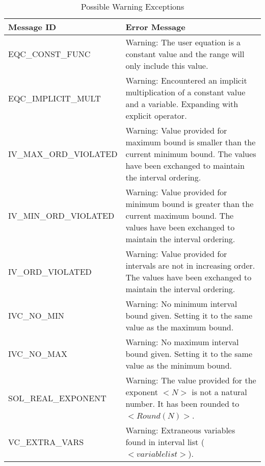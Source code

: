 \documentclass[12pt, titlepage]{article}
\begin{document}
\begin{longtable}{l p{9.5cm}}
	\caption{Possible Warning Exceptions} \\
	\toprule
	\textbf{Message ID} & \textbf{Error Message} \\
	\midrule
	EQC\_CONST\_FUNC & Warning: The user equation is a constant value and the 
	range will only include this value.\\
	EQC\_IMPLICIT\_MULT & Warning: Encountered an implicit multiplication of a 
	constant value and a variable. Expanding with explicit operator. \\
	IV\_MAX\_ORD\_VIOLATED & Warning: Value provided for maximum bound is 
	smaller than the current minimum bound. The values have been exchanged to 
	maintain the interval ordering. \\
	IV\_MIN\_ORD\_VIOLATED & Warning: Value provided for minimum bound is 
	greater than the current maximum bound. The values have been exchanged to 
	maintain the interval ordering. \\
	IV\_ORD\_VIOLATED & Warning: Value provided for intervals are not in 
	increasing order. The values have been exchanged to maintain the interval 
	ordering. \\
	IVC\_NO\_MIN & Warning: No minimum interval bound given. Setting it to the 
	same value as the maximum bound. \\
	IVC\_NO\_MAX & Warning: No maximum interval bound given. Setting it to the 
	same value as the minimum bound. \\
	SOL\_REAL\_EXPONENT & Warning: The value provided for the exponent $<N>$ is 
	not a natural number. It has been rounded to $<Round(N)>$. \\
	VC\_EXTRA\_VARS & Warning: Extraneous variables found in interval list 
	($<variable list>$). \\
	\bottomrule
\end{longtable}
\end{document}

